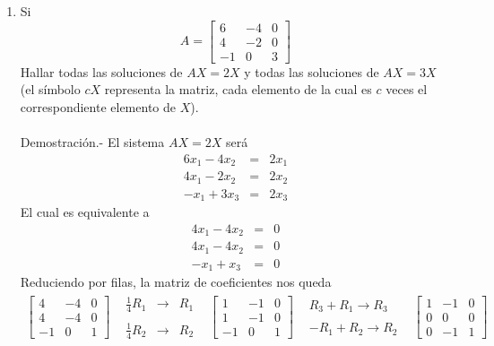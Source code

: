 \begin{enumerate}[\bfseries 1.]
    \item Si
    $$A=\left[\begin{array}{rrr}
	    6 & -4 & 0 \\
	    4 & -2 & 0 \\
	    -1 & 0 & 3 
    \end{array}\right]$$
    Hallar todas las soluciones de $AX=2X$ y todas las soluciones de $AX=3X$ (el símbolo $cX$ representa la matriz, cada elemento de la cual es $c$ veces el correspondiente elemento de $X$).\\\\
	Demostración.-\; El sistema $AX=2X$ será
	$$\begin{array}{*{3}{r}}
	    6x_1-4x_2 &=& 2x_1\\
	    4x_1-2x_2 &=& 2x_2\\
	    -x_1 +3x_3&=& 2x_3
	\end{array}$$
	El cual es equivalente a
	$$\begin{array}{*{3}{r}}
	    4x_1-4x_2 &=& 0\\
	    4x_1-4x_2 &=& 0\\
	    -x_1 +x_3&=& 0
	\end{array}$$
	Reduciendo por filas, la matriz de coeficientes nos queda
	$$
	\begin{array}{*{5}{c}}
	\left[\begin{array}{*{3}{r}}
	    4 & -4 & 0\\
	    4 & -4 & 0\\
	    -1 & 0 & 1
	\end{array}\right] & \begin{array}{rcl}
		    \frac{1}{4}R_1&\to& R_1\\\\
		    \frac{1}{4}R_2&\to& R_2 
		\end{array} &
	\left[\begin{array}{*{3}{r}}
	    1 & -1 & 0\\
	    1 & -1 & 0\\
	    -1 & 0 & 1
    \end{array}\right]  & 
	\begin{array}{rcl}
	    R_3+R_1\to R_3 \\\\
	    -R_1+R_2\to R_2
	\end{array}
	&
	\left[\begin{array}{*{3}{r}}
	    1 & -1 & 0\\
	    0 & 0 & 0\\
	    0 & -1 & 1
	\end{array}\right]\\\\

\end{array}$$
\end{enumerate}
